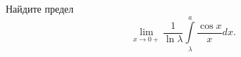 \documentclass{article}
\begin{document}
Найдите предел
$$\lim\limits_{x\to 0+} \frac{1}{\ln \lambda} \int\limits_\lambda^a \frac{\cos x}{x} dx.$$
\end{document}

